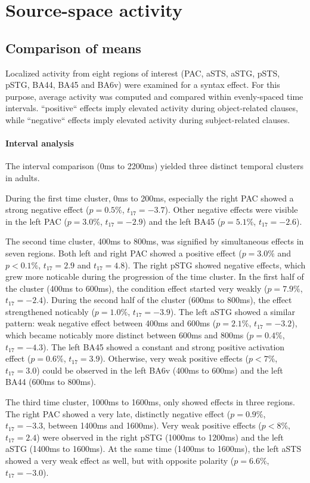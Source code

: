 \section{Source-space activity}\label{4.3}

\subsection{Comparison of means}
Localized activity from eight regions of interest (PAC, aSTS, aSTG, pSTS, pSTG, BA44, BA45 and BA6v) were examined for a syntax effect.
For this purpose, average activity was computed and compared within evenly-spaced time intervals. ``positive`` effects imply elevated activity during object-related clauses, while ``negative`` effects imply elevated activity during subject-related clauses.

\paragraph{Interval analysis}
The interval comparison (0ms to 2200ms) yielded three distinct temporal clusters in adults.

During the first time cluster, 0ms to 200ms, especially the right PAC showed a strong negative effect ($p = 0.5\%$, $t_{17} = -3.7$).
Other negative effects were visible in the left PAC ($p = 3.0\%$, $t_{17} = -2.9$) and the left BA45 ($p = 5.1\%$, $t_{17} = -2.6$).

The second time cluster, 400ms to 800ms, was signified by simultaneous effects in seven regions.
Both left and right PAC showed a positive effect ($p = 3.0\%$ and $p < 0.1\%$, $t_{17} = 2.9$ and $t_{17} = 4.8$).
The right pSTG showed negative effects, which grew more noticable during the progression of the time cluster.
In the first half of the cluster (400ms to 600ms), the condition effect started very weakly ($p = 7.9\%$, $t_{17} = -2.4$).
During the second half of the cluster (600ms to 800ms), the effect strengthened noticably ($p = 1.0\%$, $t_{17} = -3.9$).
The left aSTG showed a similar pattern: weak negative effect between 400ms and 600ms ($p = 2.1\%$, $t_{17} = -3.2$), which became noticably more distinct between 600ms and 800ms ($p = 0.4\%$, $t_{17} = -4.3$).
The left BA45 showed a constant and strong positive activation effect ($p = 0.6\%$, $t_{17} = 3.9$).
Otherwise, very weak positive effects ($p < 7\%$, $t_{17} = 3.0$) could be observed in the left BA6v (400ms to 600ms) and the left BA44 (600ms to 800ms).

The third time cluster, 1000ms to 1600ms, only showed effects in three regions.
The right PAC showed a very late, distinctly negative effect ($p = 0.9\%$, $t_{17} = -3.3$, between 1400ms and 1600ms).
Very weak positive effects ($p < 8\%$, $t_{17} = 2.4$) were observed in the right pSTG (1000ms to 1200ms) and the left aSTG (1400ms to 1600ms).
At the same time (1400ms to 1600ms), the left aSTS showed a very weak effect as well, but with opposite polarity ($p = 6.6\%$, $t_{17} = -3.0$).

